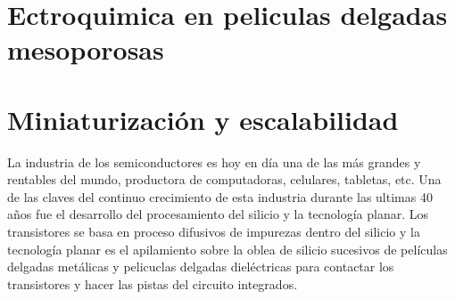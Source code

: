 	 	

\section{Ectroquimica en peliculas delgadas mesoporosas}
	
\section{Miniaturización y escalabilidad}\label{sec:microfabricacion}\label{sec:intro_fotolito}
	



		La industria de los semiconductores es hoy en día una de las más grandes y rentables del mundo, productora de computadoras, celulares, tabletas, etc. Una de las claves del continuo crecimiento de esta industria durante las ultimas 40 años fue el desarrollo del procesamiento del silicio y la tecnología planar. Los transistores se basa en proceso difusivos de impurezas dentro del silicio y la tecnología planar es el apilamiento sobre la oblea de silicio sucesivos de películas delgadas metálicas y  pelicuclas delgadas dieléctricas para contactar los transistores y hacer las pistas del circuito integrados. 

